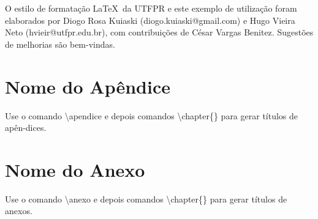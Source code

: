 \documentclass[oneside]{normas-utf-tex} %
\begin{document}
O estilo de formata\c{c}\~ao \LaTeX\ da UTFPR e este exemplo de utiliza\c{c}\~ao foram elaborados por Diogo Rosa Kuiaski (diogo.kuiaski@gmail.com) e Hugo Vieira Neto (hvieir@utfpr.edu.br), com contribui\c{c}\~oes de C\'esar Vargas Benitez. Sugest\~oes de melhorias s\~ao bem-vindas.




\apendice
\chapter{Nome do Ap\^endice}

Use o comando {\ttfamily \textbackslash apendice} e depois comandos {\ttfamily \textbackslash chapter\{\}}
para gerar t\'itulos de ap\^en-dices.


\anexo
\chapter{Nome do Anexo}

Use o comando {\ttfamily \textbackslash anexo} e depois comandos {\ttfamily \textbackslash chapter\{\}}
para gerar t\'itulos de anexos.





\end{document}

